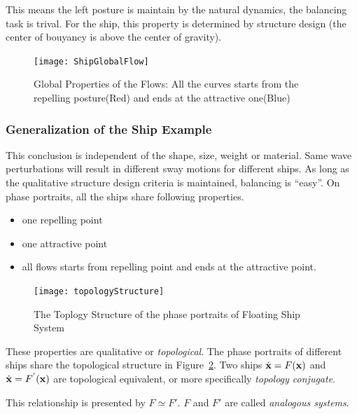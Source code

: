 This means the left posture is maintain by the natural dynamics, the balancing task is trival.
For the ship, this property is determined by structure design (the center of bouyancy is above the center of gravity).

\begin{figure}[!htbp]
  \begin{center}
   \texttt{[image: ShipGlobalFlow]}
   \caption{Global Properties of the Flows: All the curves starts from the repelling posture(Red) and ends at the attractive one(Blue)}
   \label{fig:globalflow}
  \end{center}
\end{figure}

 



\subsubsection*{Generalization of the Ship Example} 
This conclusion is independent of the shape, size, weight or material. 
Same wave perturbations will result in different sway motions for different ships.
As long as the qualitative structure design criteria is maintained, balancing is ``easy''.
On phase portraits,  all the ships share following properties. 
\begin{itemize}
\item one repelling point 
\item one attractive point 
\item all flows starts from repelling point and ends at the  attractive point. 
\end{itemize}


\begin{figure}[!htbp]
  \begin{center}
   \texttt{[image: topologyStructure]}
   \caption{The Toplogy Structure of the phase portraits of Floating Ship System}
   \label{fig:topologyStructure}
  \end{center}
\end{figure}



These properties are qualitative or \emph{topological}.
The phase portraits of different ships share the topological structure in Figure~\ref{fig:topologyStructure}.
Two ships  $\dot{\mathbf{x}}=F(\mathbf{x})$ and $\dot{\mathbf{x}}=F^{'}(\mathbf{x})$ are topological equivalent, or more specifically \emph{topology conjugate}.

This relationship is presented by $F \simeq F'$.
$F$ and $F'$ are called \emph{analogous systems}.


